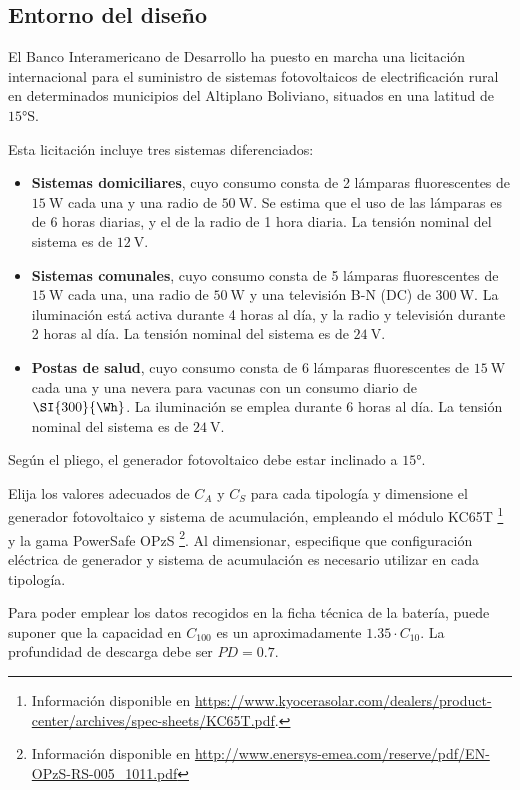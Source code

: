 \clearpage{}


\subsection{Entorno del diseño}

El Banco Interamericano de Desarrollo ha puesto en marcha una
licitación internacional para el suministro de sistemas fotovoltaicos
de electrificación rural en determinados municipios del Altiplano
Boliviano, situados en una latitud de $\ang{15}\mathrm{S}$.

Esta licitación incluye tres sistemas diferenciados:
\begin{itemize}
\item \textbf{Sistemas domiciliares}, cuyo consumo consta de 2
  lámparas fluorescentes de $\SI{15}{\watt}$ cada una y una radio de
  $\SI{50}{\watt}$. Se estima que el uso de las lámparas es de 6 horas
  diarias, y el de la radio de 1 hora diaria. La tensión nominal del
  sistema es de $\SI{12}{\volt}$.
\item \textbf{Sistemas comunales}, cuyo consumo consta de 5 lámparas
  fluorescentes de $\SI{15}{\watt}$ cada una, una radio de
  $\SI{50}{\watt}$ y una televisión B-N (DC) de $\SI{300}{\watt}$. La
  iluminación está activa durante 4 horas al día, y la radio y
  televisión durante 2 horas al día. La tensión nominal del sistema es
  de $\SI{24}{\volt}$.
\item \textbf{Postas de salud}, cuyo consumo consta de 6 lámparas
  fluorescentes de $\SI{15}{\watt}$ cada una y una nevera para vacunas
  con un consumo diario de $\SI{300}{\Wh}$. La iluminación se
  emplea durante 6 horas al día. La tensión nominal del sistema es de
  $\SI{24}{\volt}$.
\end{itemize}

Según el pliego, el generador fotovoltaico debe estar inclinado a
$\ang{15}$.

Elija los valores adecuados de $C_A$ y $C_S$ para cada tipología y
dimensione el generador fotovoltaico y sistema de acumulación,
empleando el módulo KC65T%
\footnote{Información disponible en
  \url{https://www.kyocerasolar.com/dealers/product-center/archives/spec-sheets/KC65T.pdf}.} 
y la gama PowerSafe OPzS%
\footnote{Información disponible en \url{http://www.enersys-emea.com/reserve/pdf/EN-OPzS-RS-005_1011.pdf}}. Al dimensionar, especifique que
configuración eléctrica de generador y sistema de acumulación es
necesario utilizar en cada tipología.

Para poder emplear los datos recogidos en la ficha técnica de la
batería, puede suponer que la capacidad en $C_{100}$ es un
aproximadamente $1.35 \cdot C_{10}$. La profundidad de descarga debe
ser $PD=0.7$.

